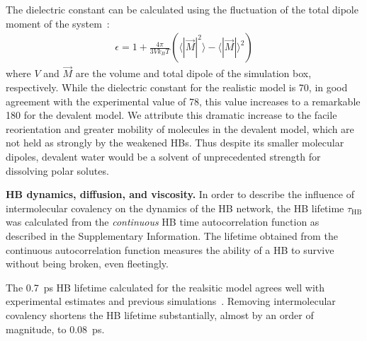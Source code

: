\documentclass[journal=jacsat,manuscript=article]{achemso}
\newcommand{\old}{\color{black}}
\newcommand{\bea}{\begin{eqnarray}}
\newcommand{\eea}{\end{eqnarray}}
\begin{document}
The dielectric constant can be calculated using the fluctuation of the total dipole moment of the system~\cite{neumann1983dipole,adams1981theory}:
%
\bea
\epsilon = 1+\frac{4\pi}{3V k_B T}  (  \langle |\vec{M}|^2 \rangle  - \langle |\vec{M}| \rangle ^2) \label{Eq:dielectric}
\eea
%
where $V$ and $\vec{M}$ are the volume and total dipole of the simulation box, respectively. 
While the dielectric constant for the realistic model is 70, in good agreement with the experimental value of 78, this value increases to a remarkable 180 for the devalent model.
We attribute this dramatic increase to the facile reorientation and greater mobility of molecules in the devalent model, which are not held as strongly by the weakened HBs. 
Thus despite its smaller molecular dipoles, devalent water would be a solvent of unprecedented strength for dissolving polar solutes.

\textbf{HB dynamics, diffusion, and viscosity.} In order to describe the influence of intermolecular covalency on the dynamics of the HB network, the HB lifetime $\tau_{\text{HB}}$ was calculated from the \emph{continuous} HB time autocorrelation function as described in the Supplementary Information. The lifetime obtained from the continuous autocorrelation function measures the ability of a HB to survive without being broken, even fleetingly.

The 0.7~ps HB lifetime calculated for the realsitic model agrees well with experimental estimates \cite{lawrence2003ultrafast} and previous simulations~\cite{marti1996molecular,starr1999fast}. Removing intermolecular covalency shortens the HB lifetime substantially, almost by an order of magnitude, to 0.08~ps. 

\end{document}
